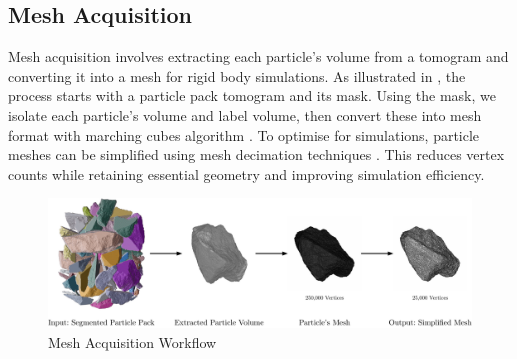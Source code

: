 \documentclass[preprint,12pt]{elsarticle}
\begin{document}
\subsection{Mesh Acquisition}
Mesh acquisition involves extracting each particle's volume from a tomogram and converting it into a mesh for rigid body simulations. 
As illustrated in , the process starts with a particle pack tomogram and its mask. 
Using the mask, we isolate each particle's volume and label volume, then convert these into mesh format with marching cubes algorithm \citep{lorensen1987marching}.
To optimise for simulations, particle meshes can be simplified using mesh decimation techniques \citep{garland1997surface}. 
This reduces vertex counts while retaining essential geometry and improving simulation efficiency.
\begin{figure}[h!]
    \includegraphics[width=\textwidth]{figures/pdf/mesh-acquisition.pdf}
    \caption{Mesh Acquisition Workflow}
    \label{fig:mesh_acquisition_workflow}
\end{figure}
\end{document}
